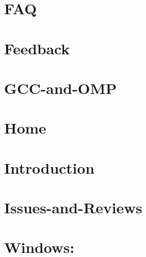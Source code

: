 \documentclass[twoside]{book}
\begin{document}
\chapter{F\-A\-Q}
\label{md__home_kodemonkey_workspace__t_s_g_l_docs-wiki__f_a_q}
\hypertarget{md__home_kodemonkey_workspace__t_s_g_l_docs-wiki__f_a_q}{}

\chapter{Feedback}
\label{md__home_kodemonkey_workspace__t_s_g_l_docs-wiki__feedback}
\hypertarget{md__home_kodemonkey_workspace__t_s_g_l_docs-wiki__feedback}{}

\chapter{G\-C\-C-\/and-\/\-O\-M\-P}
\label{md__home_kodemonkey_workspace__t_s_g_l_docs-wiki__g_c_c-and-_o_m_p}
\hypertarget{md__home_kodemonkey_workspace__t_s_g_l_docs-wiki__g_c_c-and-_o_m_p}{}

\chapter{Home}
\label{md__home_kodemonkey_workspace__t_s_g_l_docs-wiki__home}
\hypertarget{md__home_kodemonkey_workspace__t_s_g_l_docs-wiki__home}{}

\chapter{Introduction}
\label{md__home_kodemonkey_workspace__t_s_g_l_docs-wiki__installing-_t_s_g_l}
\hypertarget{md__home_kodemonkey_workspace__t_s_g_l_docs-wiki__installing-_t_s_g_l}{}

\chapter{Issues-\/and-\/\-Reviews}
\label{md__home_kodemonkey_workspace__t_s_g_l_docs-wiki__issues-and-_reviews}
\hypertarget{md__home_kodemonkey_workspace__t_s_g_l_docs-wiki__issues-and-_reviews}{}

\chapter{Windows\-:}
\label{md__home_kodemonkey_workspace__t_s_g_l_docs-wiki__library-_versions}
\hypertarget{md__home_kodemonkey_workspace__t_s_g_l_docs-wiki__library-_versions}{}

\end{document}
